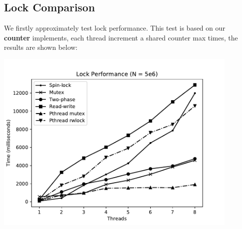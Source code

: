 \documentclass{article}
\begin{document}
\subsection{Lock Comparison}
We firstly approximately test lock performance. This test is based on our \textbf{counter} implements, each thread increment a shared counter max times, the results are shown below:
\begin{center}
\includegraphics[height=24em]{OSLAB4_LOCK1.pdf}
\end{center}
\newpage
\end{document}
